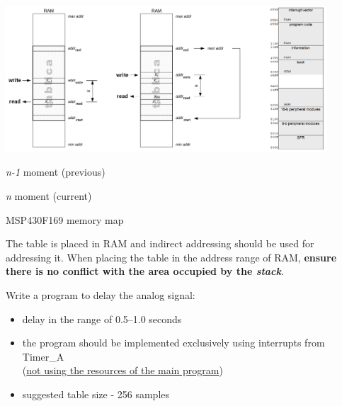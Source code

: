 \documentclass{article}
\begin{document}
\begin{center}
\noindent \includegraphics[width=0.9\textwidth]{../img/ADC_delay_DAC_3.png}
\end{center}

\begin{multicols}{3}
    \begin{center}
    \textit{n-1} moment (previous)
    \end{center}
    \columnbreak
    \begin{center}
    \textit{n} moment (current)
    \end{center}
    \columnbreak
    \begin{center}
    MSP430F169 memory map
    \end{center}
\end{multicols}

The table is placed in RAM and indirect addressing should be used for addressing it. When placing the table in the address range of RAM, \textbf{ensure there is no conflict with the area occupied by the \textit{stack}}.
\vspace{5mm}

Write a program to delay the analog signal:
\begin{itemize}
    \item delay in the range of 0.5–1.0 seconds
    \item the program should be implemented exclusively using interrupts from Timer\_A \\
    (\underline{not using the resources of the main program})
    \item suggested table size - 256 samples
\end{itemize}
\end{document}
